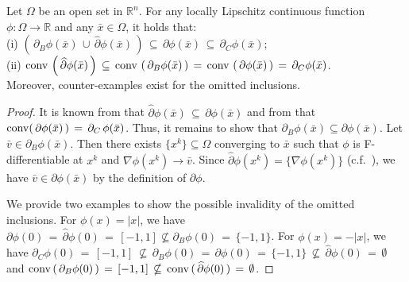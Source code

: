 \documentclass{siamart}
\newcommand{\wh}{\widehat}
\begin{document}
\begin{proposition}\label{prop: subdifferentials}
Let $\Omega$ be an open set in $\mathbb{R}^n$.
For any locally Lipschitz continuous function $\phi : \Omega\to \mathbb{R}$ and any $\bar{x}\in \Omega$, it holds that:\\
(i) $\left(\,\partial_B \phi(\bar{x}) \, \cup \, \wh{\partial} \phi(\bar{x})\,\right)
\,\subseteq \, \partial \phi(\bar{x})\,\subseteq\, \partial_C \phi(\bar{x})$;\\
%
%
(ii) ${\rm conv}\, \left(\,\wh{\partial} \phi(\bar{x})\,\right) \, \subseteq \, {\rm conv} \, \left( \, \partial_B \phi(\bar{x}) \,\right)
\, = \, {\rm conv}\, \left( \,\partial \phi(\bar{x})\, \right) \, = \, \partial_C \phi(\bar{x})$.\\
Moreover, counter-examples exist for the omitted inclusions.
\end{proposition}
\begin{proof}
It is known from \cite[Theorem 8.6]{RockafellarRWets98} that $\wh{\partial} \phi(\bar{x}) \, \subseteq \, \partial  \phi(\bar{x})$ and
from \cite[Theorem 3.57]{Mordukhovich2006} that ${\rm conv} ( \,\partial  \phi(\bar{x}) \, ) \, = \, \partial_C \, \phi(\bar{x})$.
Thus, %
it remains to show that $\partial_B \phi(\bar{x})\subseteq \partial \phi(\bar{x})$.
Let $\bar{v} \in \partial_B \phi(\bar{x})$.
Then there exists $\{x^k\} \subseteq \Omega$ converging to $\bar{x}$ such that $\phi$ is F-differentiable at $x^k$ and
$\nabla \phi(x^k) \to \bar{v}$.  Since $\wh{\partial} \phi(x^k) = \{ \nabla \phi(x^k)\}$ (c.f.\ \cite[Exercise 8.8]{RockafellarRWets98}),
we have $\bar{v}\in \partial \phi(\bar{x})$ by the definition of $\partial \phi$.



We provide two examples to show the possible invalidity of the omitted inclusions.
For $\phi(x) = |x|$, we have $ \partial \phi(0) \,=\,  \wh{\partial} \phi(0) \,= \,[-1,1] \nsubseteq  \partial_B \phi(0) \, = \, \{ -1,1 \}$.
For $\phi(x) = -|x|$,  we have $\partial_C \phi(0) \,= \,[-1,1] \, \nsubseteq \, {\partial}_B \phi(0) \, = \, \partial \phi(0) \, = \, \{-1,1\} \, \nsubseteq \,
\wh{\partial} \phi(0) \, = \, \emptyset$ and ${\rm conv}\, (\,\partial_B \phi(0)\,)\,=\,[-1,1]\,\nsubseteq\, {\rm conv}\, (\,\wh{\partial} \phi(0)\,) \, = \, \emptyset$.
\end{proof}
\end{document}
